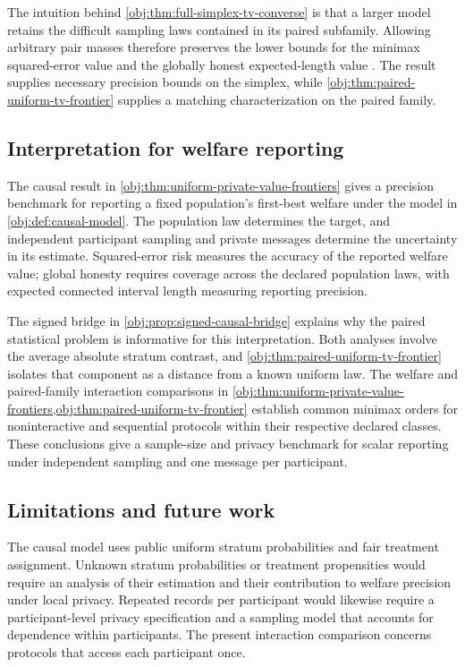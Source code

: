 \documentclass[11pt]{article}
\begin{document}
The intuition behind \cref{obj:thm:full-simplex-tv-converse} is that a larger model retains the difficult sampling laws contained in its paired subfamily. Allowing arbitrary pair masses therefore preserves the lower bounds for the minimax squared-error value  and the globally honest expected-length value . The result supplies necessary precision bounds on the simplex, while \cref{obj:thm:paired-uniform-tv-frontier} supplies a matching characterization on the paired family.

\subsection{Interpretation for welfare reporting}

The causal result in \cref{obj:thm:uniform-private-value-frontiers} gives a precision benchmark for reporting a fixed population's first-best welfare under the model in \cref{obj:def:causal-model}. The population law determines the target, and independent participant sampling and private messages determine the uncertainty in its estimate. Squared-error risk measures the accuracy of the reported welfare value; global honesty requires coverage across the declared population laws, with expected connected interval length measuring reporting precision.

The signed bridge in \cref{obj:prop:signed-causal-bridge} explains why the paired statistical problem is informative for this interpretation. Both analyses involve the average absolute stratum contrast, and \cref{obj:thm:paired-uniform-tv-frontier} isolates that component as a distance from a known uniform law. The welfare and paired-family interaction comparisons in \cref{obj:thm:uniform-private-value-frontiers,obj:thm:paired-uniform-tv-frontier} establish common minimax orders for noninteractive and sequential protocols within their respective declared classes. These conclusions give a sample-size and privacy benchmark for scalar reporting under independent sampling and one message per participant.

\subsection{Limitations and future work}

The causal model uses public uniform stratum probabilities and fair treatment assignment. Unknown stratum probabilities or treatment propensities would require an analysis of their estimation and their contribution to welfare precision under local privacy. Repeated records per participant would likewise require a participant-level privacy specification and a sampling model that accounts for dependence within participants. The present interaction comparison concerns protocols that access each participant once.
\end{document}
